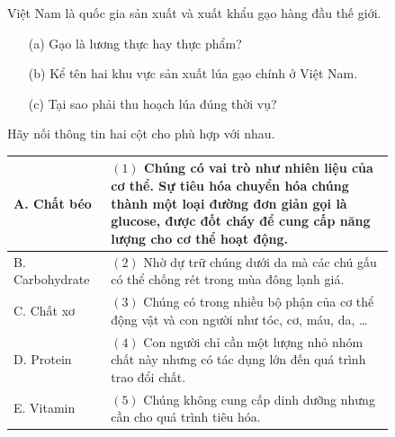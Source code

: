 \documentclass[Main.tex]{subfiles}
\begin{document}
\begin{bt}%
	Việt Nam là quốc gia sản xuất và xuất khẩu gạo hàng đầu thế giới.
	\begin{enumerate}
		\item[(a)] Gạo là lương thực hay thực phẩm?
		\item[(b)] Kể tên hai khu vực sản xuất lúa gạo chính ở Việt Nam.
		\item[(c)] Tại sao phải thu hoạch lúa đúng thời vụ?
	\end{enumerate}
\end{bt}

\begin{bt}%
	Hãy nối thông tin hai cột cho phù hợp với nhau.
	\begin{center}
		\renewcommand{\arraystretch}{1.15}
		\begin{tabular}{|C{0.18\linewidth}|L{0.66\linewidth}|}
			\hline
			A. Chất béo & $(1)$ Chúng có vai trò như nhiên liệu của cơ thể. Sự tiêu hóa chuyển hóa chúng thành một loại đường đơn giản gọi là glucose, được đốt cháy để cung cấp năng lượng cho cơ thể hoạt động. \\
			\hline
			B. Carbohydrate & $(2)$ Nhờ dự trữ chúng dưới da mà các chú gấu có thể chống rét trong mùa đông lạnh giá. \\
			\hline
			C. Chất xơ & $(3)$ Chúng có trong nhiều bộ phận của cơ thể động vật và con người như tóc, cơ, máu, da, … \\
			\hline
			D. Protein & $(4)$ Con người chỉ cần một lượng nhỏ nhóm chất này nhưng có tác dụng lớn đến quá trình trao đổi chất. \\
			\hline
			E. Vitamin & $(5)$ Chúng không cung cấp dinh dưỡng nhưng cần cho quá trình tiêu hóa. \\
			\hline
		\end{tabular}
	\end{center}
\end{bt}
\end{document}
